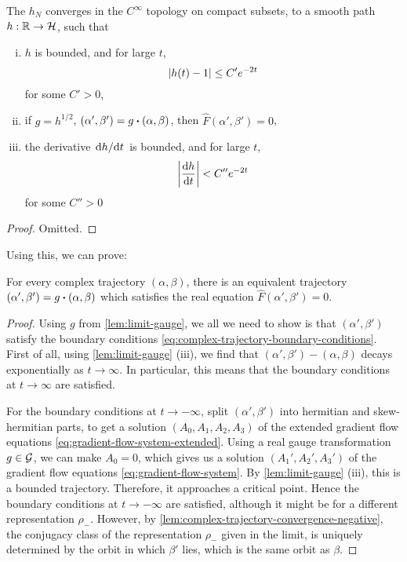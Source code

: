\documentclass{article}
\begin{document}
\begin{lemma}
    \label{lem:limit-gauge}
    The \(h_N\) converges in the \(C^\infty\) topology on compact subsets, to a smooth path \(h : \mathbb{R} \to \mathcal{H}\), such that

    \begin{enumerate}[(i)]
        \item \(h\) is bounded, and for large \(t\), \[\abs{h(t) - 1} \le C'e^{-2t}\] for some \(C' > 0\),
        \item if \(g = h^{1/2}\), \((\alpha', \beta') = g \vdot (\alpha, \beta)\), then \(\hat F(\alpha', \beta') = 0\),
        \item the derivative \(\dv*{h}{t}\) is bounded, and for large \(t\), \[\abs{\dv{h}{t}} < C''e^{-2t}\] for some \(C'' > 0\)
    \end{enumerate}
\end{lemma}

\begin{proof}
    Omitted.
\end{proof}

Using this, we can prove:

\begin{proposition}
    \label{prop:real-trajectory-existence}

    For every complex trajectory \((\alpha, \beta)\), there is an equivalent trajectory \((\alpha', \beta') = g \vdot (\alpha, \beta)\) which satisfies the real equation \(\hat F(\alpha', \beta') = 0\).
\end{proposition}

\begin{proof}
    Using \(g\) from \cref{lem:limit-gauge}, we all we need to show is that \((\alpha', \beta')\) satisfy the boundary conditions \cref{eq:complex-trajectory-boundary-conditions}. First of all, using \cref{lem:limit-gauge} (iii), we find that \((\alpha', \beta') - (\alpha, \beta)\) decays exponentially as \(t \to \infty\). In particular, this means that the boundary conditions at \(t \to \infty\) are satisfied.

    For the boundary conditions at \(t \to -\infty\), split \((\alpha', \beta')\) into hermitian and skew-hermitian parts, to get a solution \((A_0, A_1, A_2, A_3)\) of the extended gradient flow equations \cref{eq:gradient-flow-system-extended}. Using a real gauge transformation \(g \in \mathcal{G}\), we can make \(A_0 = 0\), which gives us a solution \((A_1', A_2', A_3')\) of the gradient flow equations \cref{eq:gradient-flow-system}. By \cref{lem:limit-gauge} (iii), this is a bounded trajectory. Therefore, it approaches a critical point. Hence the boundary conditions at \(t \to -\infty\) are satisfied, although it might be for a different representation \(\rho_-\). However, by \cref{lem:complex-trajectory-convergence-negative}, the conjugacy class of the representation \(\rho_-\) given in the limit, is uniquely determined by the orbit in which \(\beta'\) lies, which is the same orbit as \(\beta\).
\end{proof}
\end{document}
